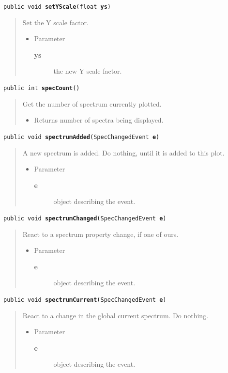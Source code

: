 \documentclass[twoside,11pt]{article}
\renewcommand{\_}{\texttt{\symbol{95}}}
\newcommand{\method}[1]{\texttt{#1}}
\newenvironment{desc}{\begin{quote}}{\end{quote}}
\begin{document}
\method{public void \textbf{setYScale}(\texttt{float} \textbf{ys})\label{l212}\label{l213}}
\begin{desc}Set the Y scale factor.
\begin{itemize}
\item{Parameter
  \begin{description}
   \item[\textbf{ys}]{the new Y scale factor.}
  \end{description}}
\end{itemize}
\end{desc}

\method{public int \textbf{specCount}()\label{l214}\label{l215}}
\begin{desc}Get the number of spectrum currently plotted.
\begin{itemize}
\item{Returns number of spectra being displayed. }
\end{itemize}
\end{desc}

\method{public void \textbf{spectrumAdded}(\texttt{SpecChangedEvent} \textbf{e})\label{l216}\label{l217}}
\begin{desc}A new spectrum is added. Do nothing, until it is added to this
 plot.
\begin{itemize}
\item{Parameter
  \begin{description}
   \item[\textbf{e}]{object describing the event.}
  \end{description}}
\end{itemize}
\end{desc}

\method{public void \textbf{spectrumChanged}(\texttt{SpecChangedEvent} \textbf{e})\label{l218}\label{l219}}
\begin{desc}React to a spectrum property change, if one of ours.
\begin{itemize}
\item{Parameter
  \begin{description}
   \item[\textbf{e}]{object describing the event.}
  \end{description}}
\end{itemize}
\end{desc}

\method{public void \textbf{spectrumCurrent}(\texttt{SpecChangedEvent} \textbf{e})\label{l220}\label{l221}}
\begin{desc}React to a change in the global current spectrum. Do nothing.
\begin{itemize}
\item{Parameter
  \begin{description}
   \item[\textbf{e}]{object describing the event.}
  \end{description}}
\end{itemize}
\end{desc}
\end{document}

